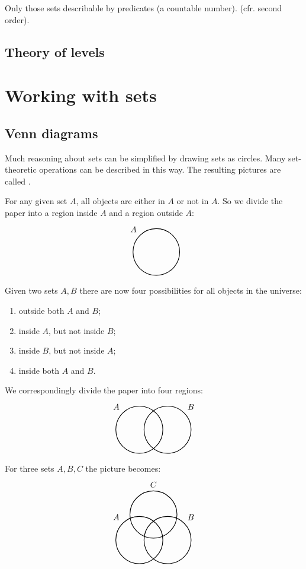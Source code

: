Only those sets describable by predicates (a countable number). (cfr. second order).

\subsection{Theory of levels}

\section{Working with sets}
\subsection{Venn diagrams}
Much reasoning about sets can be simplified by drawing sets as circles. Many set-theoretic operations can be described in this way. The resulting pictures are called .

For any given set $A$, all objects are either in $A$ or not in $A$. So we divide the paper into a region inside $A$ and a region outside $A$:
\[\begin{tikzpicture}[thick]
\node[draw,
    circle,
    minimum size =2cm,
    label=135:$A$] (circle1) at (0,0){};
\end{tikzpicture} \]

Given two sets $A,B$ there are now four possibilities for all objects in the universe:
\begin{enumerate}
\item outside both $A$ and $B$;
\item inside $A$, but not inside $B$;
\item inside $B$, but not inside $A$;
\item inside both $A$ and $B$.
\end{enumerate}
We correspondingly divide the paper into four regions:
\[ \begin{tikzpicture}[thick]
\node [draw,
    circle,
    minimum size =2cm,
    label={135:$A$}] (A) at (0,0){};
\node [draw,
    circle,
    minimum size =2cm,
    label={45:$B$}] (B) at (1.2,0){};
\end{tikzpicture} \]

For three sets $A,B,C$ the picture becomes:
\[ \begin{tikzpicture}[thick]
\node[draw,circle,minimum size =2cm,label={135:$A$}] (A) at (0,0) {};

\node[draw,circle,minimum size =2cm,label={45:$B$}] (B) at (1.2,0) {};

\node[draw,circle,minimum size =2cm,label=$C$] (C) at (0.6,1.08) {};
\end{tikzpicture} \]

